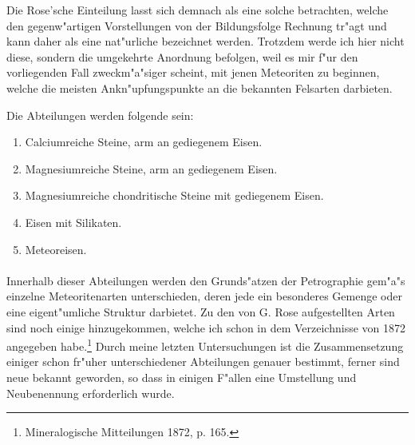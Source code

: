 \documentclass[a4paper, 11pt, oneside, polutonikogreek, german]{article}
\begin{document}
Die Rose'sche Einteilung lasst sich demnach als eine solche betrachten, welche den gegenw"artigen Vorstellungen von der Bildungsfolge Rechnung tr"agt und kann daher als eine nat"urliche bezeichnet werden. Trotzdem werde ich hier nicht diese, sondern die umgekehrte Anordnung befolgen, weil es mir f"ur den vorliegenden Fall zweckm"a"siger scheint, mit jenen Meteoriten zu beginnen, welche die meisten Ankn"upfungspunkte an die bekannten Felsarten darbieten.

Die Abteilungen werden folgende sein:
\begin{enumerate}
    \item Calciumreiche Steine, arm an gediegenem Eisen.  
    \item Magnesiumreiche Steine, arm an gediegenem Eisen.  
    \item Magnesiumreiche chondritische Steine mit gediegenem Eisen.  
    \item Eisen mit Silikaten.  
    \item Meteoreisen.
\end{enumerate}
\paragraph*{}
Innerhalb dieser Abteilungen werden den Grunds"atzen der Petrographie gem"a"s einzelne Meteoritenarten unterschieden, deren jede ein besonderes Gemenge oder eine eigent"umliche Struktur darbietet. Zu den von G. Rose aufgestellten Arten sind noch einige hinzugekommen, welche ich schon in dem Verzeichnisse von 1872 angegeben habe.\footnote{Mineralogische Mitteilungen 1872, p. 165.} Durch meine letzten Untersuchungen ist die Zusammensetzung einiger schon fr"uher unterschiedener Abteilungen genauer bestimmt, ferner sind neue bekannt geworden, so dass in einigen F"allen eine Umstellung und Neubenennung erforderlich wurde.
\end{document}
